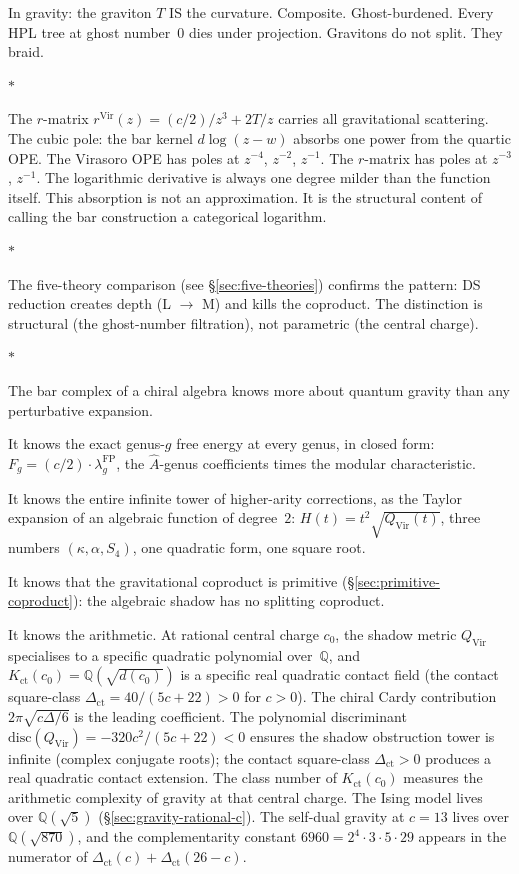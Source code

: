 \documentclass[11pt]{article}
\newcommand{\Q}{\mathbb{Q}}
\newcommand{\sep}{\bigskip\begin{center}$*$\end{center}\medskip}
\begin{document}
In gravity: the graviton $T$ IS the curvature.  Composite.
Ghost-burdened.  Every HPL tree at ghost number~$0$ dies under
projection.  Gravitons do not split.  They braid.

\sep

The $r$-matrix $r^{\mathrm{Vir}}(z) = (c/2)/z^3 + 2T/z$
carries all gravitational scattering.  The cubic pole: the bar
kernel $d\log(z-w)$ absorbs one power from the quartic OPE.
The Virasoro OPE has poles at $z^{-4}$, $z^{-2}$, $z^{-1}$.
The $r$-matrix has poles at $z^{-3}$, $z^{-1}$.  The
logarithmic derivative is always one degree milder than the
function itself.  This absorption is not an approximation.  It
is the structural content of calling the bar construction a
categorical logarithm.

\sep

The five-theory comparison (see \S\ref{sec:five-theories})
confirms the pattern: DS reduction creates depth (L $\to$ M)
and kills the coproduct.  The distinction is structural
(the ghost-number filtration), not parametric (the central charge).

\sep

The bar complex of a chiral algebra knows more about quantum
gravity than any perturbative expansion.

It knows the exact genus-$g$ free energy at every genus, in
closed form:
$F_g = (c/2) \cdot \lambda_g^{\mathrm{FP}}$, the
$\hat{A}$-genus coefficients times the modular characteristic.

It knows the entire infinite tower of higher-arity corrections,
as the Taylor expansion of an algebraic function of degree~$2$:
$H(t) = t^2\sqrt{Q_{\mathrm{Vir}}(t)}$, three numbers
$(\kappa, \alpha, S_4)$, one quadratic form, one square root.

It knows that the gravitational coproduct is primitive
(\S\ref{sec:primitive-coproduct}): the algebraic shadow has no
splitting coproduct.

It knows the arithmetic.  At rational central charge $c_0$,
the shadow metric $Q_{\mathrm{Vir}}$ specialises to a specific
quadratic polynomial over~$\Q$, and
$K_{\mathrm{ct}}(c_0) = \Q(\sqrt{d(c_0)})$ is a specific real
quadratic contact field (the contact square-class
$\Delta_{\mathrm{ct}} = 40/(5c{+}22) > 0$ for $c > 0$).  The
chiral Cardy contribution $2\pi\sqrt{c\Delta/6}$
is the leading coefficient.  The polynomial discriminant
$\mathrm{disc}(Q_{\mathrm{Vir}}) = -320c^2/(5c+22) < 0$ ensures
the shadow obstruction tower is infinite (complex conjugate roots); the
contact square-class $\Delta_{\mathrm{ct}}>0$ produces a real
quadratic contact extension.  The class number of $K_{\mathrm{ct}}(c_0)$ measures the arithmetic complexity
of gravity at that central charge.  The Ising model lives over
$\Q(\sqrt{5})$ (\S\ref{sec:gravity-rational-c}).
The self-dual gravity at $c = 13$ lives over $\Q(\sqrt{870})$,
and the complementarity constant $6960 = 2^4 \cdot 3 \cdot 5
\cdot 29$ appears in the numerator of
$\Delta_{\mathrm{ct}}(c) + \Delta_{\mathrm{ct}}(26{-}c)$.
\end{document}
